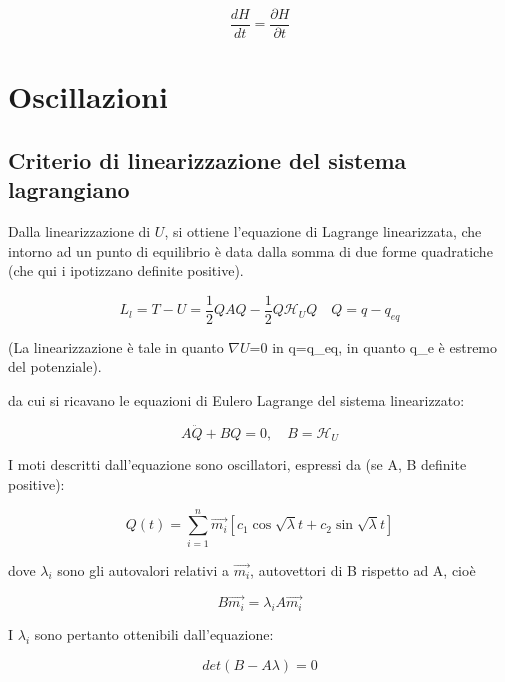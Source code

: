 \documentclass{article}
\begin{document}
            \begin{equation}
                \frac{d H}{dt}= \frac{\partial H}{\partial t}
            \end{equation}


            \section{Oscillazioni}
            \subsection{Criterio di linearizzazione del sistema lagrangiano}
            Dalla linearizzazione di $U$, si ottiene l'equazione di Lagrange linearizzata, che intorno ad un punto di equilibrio è data dalla somma di due forme quadratiche (che qui i ipotizzano definite positive).

            \begin{equation}
                L_l=T-U= \frac{1}{2}QAQ- \frac{1}{2}Q\mathcal{H}_UQ \quad Q=q-q_{eq}
            \end{equation}

            (La linearizzazione è tale in quanto $\nabla$$U$=0 in q=q\_{eq}, in quanto q\_e è estremo del potenziale).

        da cui si ricavano le equazioni di Eulero Lagrange del sistema linearizzato:

        \begin{equation}
            A\ddot{Q} + BQ = 0, \quad B = \mathcal{H}_U
        \end{equation}

        I moti descritti dall'equazione sono oscillatori, espressi da (se A, B definite positive):

        \begin{equation}
            Q(t)=\sum_{i=1}^n \vec{m_i}[c_1 \cos{\sqrt{\lambda}t}+c_2 \sin{\sqrt{\lambda}t}]
        \end{equation}

        dove $\lambda_i$ sono gli autovalori relativi a $\Vec{m_i}$, autovettori di B rispetto ad A, cioè

        \begin{equation}
            B \vec{m_i}=\lambda_iA\vec{m_i}
        \end{equation}

        I $\lambda_i$ sono pertanto ottenibili dall'equazione:

        \begin{equation}
            det(B-A\lambda)=0
        \end{equation}
\end{document}
